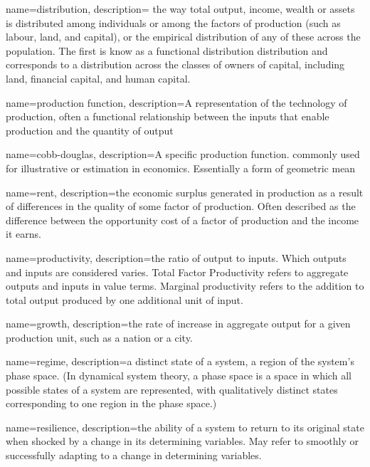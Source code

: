 {
name=distribution,
description={ the way total output, income, wealth or assets is distributed among individuals or among the factors of production (such as labour, land, and capital), or the empirical distribution of any of these across the population. The first is know as a functional distribution distribution and  corresponds to a distribution across the classes of owners  of capital, including land, financial capital, and human capital. }
}

{
name=production function,
description={A representation of the technology of production, often a functional relationship between the inputs that enable production and the quantity of output}
}

{
name=cobb-douglas,
description={A specific production function. commonly used for illustrative or estimation in economics. Essentially a form of geometric mean}
}

{
name=rent,
description={the economic  surplus generated in production as a result of differences in the quality of some factor of production. Often described as the difference between the opportunity cost of a factor of production and the income it earns. }
}

{
name=productivity,
description={the ratio of output to inputs. Which outputs and inputs are considered varies. Total Factor Productivity refers to aggregate outputs and inputs in value terms. Marginal productivity refers to the addition to total output produced by one additional unit of input.} 
}

{
name=growth,
description={the rate of increase in aggregate output for a given production unit, such as a nation  or a city.}
}

{
name=regime,
description={a distinct state of a system, a region of the system's phase space. (In dynamical system theory, a phase space is a space in which all possible states of a system are represented, with qualitatively distinct  states corresponding to one region in the phase space.)}
}

{
name=resilience,
description={the ability of a system to return to its original state when shocked by a change in its determining variables. May refer to smoothly or successfully adapting to a change in  determining variables. }
}

